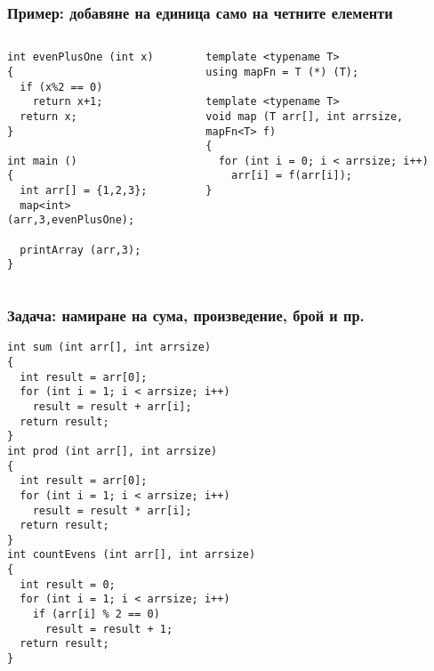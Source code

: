 \documentclass{beamer}
\begin{document}
\begin{frame}[fragile]
\frametitle{Пример: добавяне на единица само на четните елементи}


\begin{columns}[t]
  \begin{column}{0.5\textwidth}

\begin{flushleft}
\begin{lstlisting}
int evenPlusOne (int x)
{
  if (x%2 == 0)
    return x+1;
  return x;  
}

int main ()
{
  int arr[] = {1,2,3};
  map<int> (arr,3,evenPlusOne);

  printArray (arr,3);
}

\end{lstlisting}  
\end{flushleft}
  \end{column}
  \begin{column}{0.5\textwidth}
\begin{flushleft}
\begin{lstlisting}
template <typename T>
using mapFn = T (*) (T);

template <typename T>
void map (T arr[], int arrsize, mapFn<T> f)
{
  for (int i = 0; i < arrsize; i++)
    arr[i] = f(arr[i]);
}
\end{lstlisting}  
\end{flushleft}

  \end{column}
\end{columns}


\end{frame}



\begin{frame}[fragile]
\frametitle{Задача: намиране на сума, произведение, брой и пр.}

\begin{flushleft}
\begin{lstlisting}
int sum (int arr[], int arrsize)
{
  int result = arr[0];
  for (int i = 1; i < arrsize; i++)
    result = result + arr[i];
  return result;
}
int prod (int arr[], int arrsize)
{
  int result = arr[0];
  for (int i = 1; i < arrsize; i++)
    result = result * arr[i];
  return result;
}
int countEvens (int arr[], int arrsize)
{
  int result = 0;
  for (int i = 1; i < arrsize; i++)
    if (arr[i] % 2 == 0)
      result = result + 1;
  return result;
}
\end{lstlisting}  
\end{flushleft}

  
\end{frame}
\end{document}
